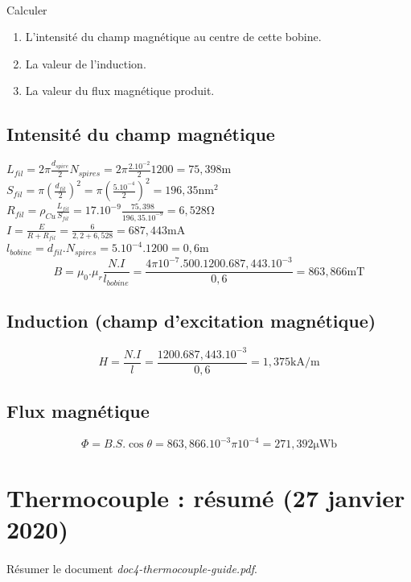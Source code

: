\documentclass{article}
\begin{document}
\paragraph{}
Calculer
\begin{enumerate}
    \item L'intensité du champ magnétique au centre de cette bobine.
    \item La valeur de l'induction.
    \item La valeur du flux magnétique produit.
\end{enumerate}

\subsection{Intensité du champ magnétique}
$L_{fil} = 2 \pi \frac{d_{spire}}{2}N_{spires} = 2 \pi \frac{2.10^{-2}}{2}1200 = 75,398 \si{\meter}$\\
$S_{fil} = \pi \left(\frac{d_{fil}}{2}\right)^2 = \pi \left(\frac{5.10^{-4}}{2}\right)^2 = 196,35 \si{\nano\meter^2}$\\
$R_{fil} = \rho_{Cu} \frac{L_{fil}}{S_{fil}} = 17.10^{-9} \frac{75,398}{196,35.10^{-9}} = 6,528 \si{\ohm}$\\
$I = \frac{E}{R + R_{fil}} = \frac{6}{2,2 + 6,528} = 687,443\si{\milli\ampere}$\\
$l_{bobine} = d_{fil}.N_{spires} = 5.10^{-4}.1200 = 0,6\si{\meter}$
$$B = \mu_0.\mu_r\frac{N.I}{l_{bobine}} = \frac{4\pi10^{-7}.500.1200.687,443.10^{-3}}{0,6} = 863,866 \si{\milli\tesla}$$

\subsection{Induction (champ d'excitation magnétique)}
$$H = \frac{N.I}{l} = \frac{1200.687,443.10^{-3}}{0,6} = 1,375 \si{\kilo\ampere}/\si{\meter}$$

\subsection{Flux magnétique}
$$ \Phi= B.S.\cos\theta = 863,866.10^{-3}\pi10^{-4} = 271,392 \si{\micro\weber}$$


\newpage
\section{Thermocouple : résumé (27 janvier 2020)}
\paragraph{}
Résumer le document \emph{doc4-thermocouple-guide.pdf}.
\end{document}
